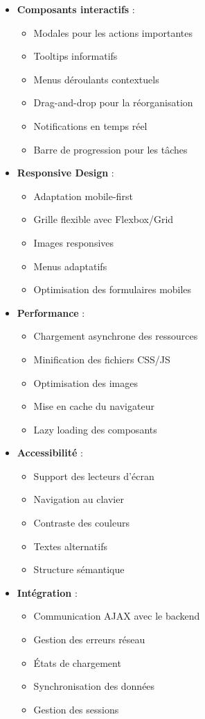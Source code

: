 \documentclass[12pt,a4paper]{article}
\begin{document}
\begin{itemize}
    \item \textbf{Composants interactifs} :
    \begin{itemize}
        \item Modales pour les actions importantes
        \item Tooltips informatifs
        \item Menus déroulants contextuels
        \item Drag-and-drop pour la réorganisation
        \item Notifications en temps réel
        \item Barre de progression pour les tâches
    \end{itemize}

    \item \textbf{Responsive Design} :
    \begin{itemize}
        \item Adaptation mobile-first
        \item Grille flexible avec Flexbox/Grid
        \item Images responsives
        \item Menus adaptatifs
        \item Optimisation des formulaires mobiles
    \end{itemize}

    \item \textbf{Performance} :
    \begin{itemize}
        \item Chargement asynchrone des ressources
        \item Minification des fichiers CSS/JS
        \item Optimisation des images
        \item Mise en cache du navigateur
        \item Lazy loading des composants
    \end{itemize}

    \item \textbf{Accessibilité} :
    \begin{itemize}
        \item Support des lecteurs d'écran
        \item Navigation au clavier
        \item Contraste des couleurs
        \item Textes alternatifs
        \item Structure sémantique
    \end{itemize}

    \item \textbf{Intégration} :
    \begin{itemize}
        \item Communication AJAX avec le backend
        \item Gestion des erreurs réseau
        \item États de chargement
        \item Synchronisation des données
        \item Gestion des sessions
    \end{itemize}
\end{itemize}
\end{document}
